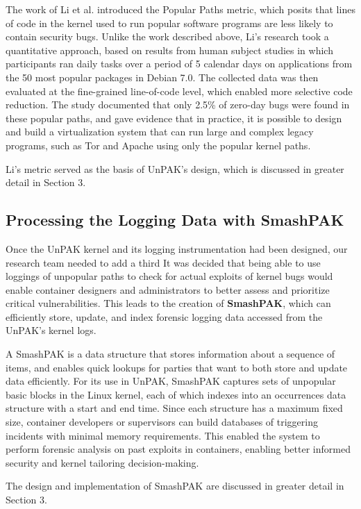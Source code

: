 The work of Li et al. \cite{Lock-in-Pop} introduced the Popular Paths metric, which posits that lines of code in the kernel used to run popular software programs are less likely to contain security bugs. 
Unlike the work described above, Li’s research  took a quantitative approach, based on results from human subject studies in which participants ran daily tasks over a period of 5 calendar days on 
applications from the 50 most popular packages in Debian 7.0. The collected data was then evaluated at the fine-grained line-of-code level, which enabled more selective code reduction. 
The study documented that only 2.5\% of zero-day bugs were found in these popular paths, and gave evidence that in practice, 
it is possible to design and build a virtualization system that can run large and complex legacy programs, such as Tor and Apache using only the popular kernel paths.  

Li’s metric served as the basis of UnPAK’s design, which is discussed in greater detail in Section 3. 

\subsection{Processing the Logging Data with SmashPAK}
\label{sec.motivation.smashpak}
Once the UnPAK kernel and its logging instrumentation had been designed,  
our research team needed to add a third It was decided that being able to use loggings of unpopular paths to check for actual exploits of kernel bugs would enable container designers 
and administrators to better assess and prioritize critical vulnerabilities. This leads to the creation of \textbf{SmashPAK}, which can efficiently store, update, and index forensic logging data accessed 
from the UnPAK’s kernel logs. 

A SmashPAK is a data structure that stores information about a sequence of items, and enables quick lookups for parties that want to both store and update data efficiently. 
For its use in UnPAK, SmashPAK captures sets of unpopular basic blocks in the Linux kernel, each of which indexes into an occurrences data structure with a start and end time. 
Since each structure has a maximum fixed size, container developers or supervisors can build databases of triggering incidents with minimal memory requirements. 
This enabled the system to perform forensic analysis on past exploits in containers, enabling better informed security and kernel tailoring decision-making.

The design and implementation of SmashPAK are discussed in greater detail in Section 3. 